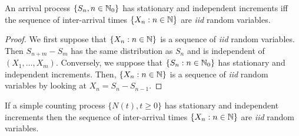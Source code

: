 \documentclass[a4paper,10pt,english]{article}
\begin{document}
\begin{lem} 
An arrival process $\{S_n, n \in \mathbb{N}_0\}$ has stationary and independent increments iff 
the sequence of inter-arrival times $\{X_n: n \in \mathbb{N}\}$ are \textit{iid} random variables.
\end{lem}
\begin{proof} 
We first suppose that $\{X_n: n \in \mathbb{N}\}$ is a sequence of \textit{iid} random variables. 
Then $S_{n+m} - S_m$ has the same distribution as $S_n$ and is independent of $(X_1, \ldots, X_m)$. 
Conversely, we suppose that $\{S_n: n \in \mathbb{N}_0\}$ has stationary and independent increments. 
Then, $\{X_n: n \in \mathbb{N}\}$ is a sequence of \textit{iid} random variables by looking at $X_n = S_n - S_{n-1}$.   
\end{proof}

\begin{lem} If a simple counting process $\{N(t), t \ge 0\}$ has stationary and independent increments then 
the sequence of inter-arrival times $\{X_n: n \in \mathbb{N}\}$ are \textit{iid} random variables.
\end{lem}
\end{document}
